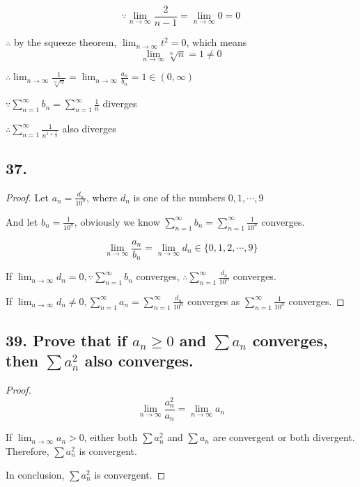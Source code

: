 \documentclass{article}
\begin{document}
    $$\because \lim_{n\to\infty} \frac{2}{n-1} = \lim_{n\to\infty}0 = 0$$

    $\therefore$ by the squeeze theorem, $\lim_{n\to\infty} t^2 = 0$, which means $$\lim_{n\to\infty} \sqrt[n]n = 1 \not = 0$$

    $\therefore \lim_{n\to\infty} \frac{1}{\sqrt[n]n} = \lim_{n\to\infty}\frac{a_n}{b_n} = 1 \in (0, \infty)$
    
    $\because \sum_{n=1}^\infty b_n = \sum_{n=1}^\infty \frac 1 n$ diverges

    $\therefore \sum_{n=1}^\infty \frac{1}{n^{1+\frac 1 n}}$ also diverges

    \subsection*{37. }

    \begin{proof}
        Let $a_n = \frac{d_n}{10^n}$, where $d_n$ is one of the numbers $0, 1, \cdots, 9$
        
        And let $b_n = \frac{1}{10^n}$, obviously we know $\sum_{n=1}^\infty b_n = \sum_{n=1}^\infty \frac{1}{10^n}$ converges. 

        $$\lim_{n\to\infty}\frac{a_n}{b_n} = \lim_{n\to\infty}d_n \in \{0, 1, 2, \cdots, 9\}$$

        If $\lim_{n\to\infty}d_n = 0, \because \sum_{n=1}^\infty b_n$ converges, $\therefore \sum_{n=1}^\infty \frac{d_n}{10^n}$ converges.

        If $\lim_{n\to\infty}d_n \not = 0, \sum_{n=1}^\infty a_n = \sum_{n=1}^\infty \frac{d_n}{10^n}$ converges as $\sum_{n=1}^\infty \frac{1}{10^n}$ converges.

    \end{proof}

    \subsection*{39. Prove that if $a_n \geq 0$ and $\sum a_n$ converges, then $\sum a_n^2$ also converges.}

    \begin{proof}
        $$\lim_{n\to\infty}\frac{a_n^2}{a_n} = \lim_{n\to\infty}a_n$$

        If $\lim_{n\to\infty}a_n > 0$, either both $\sum a_n^2$ and $\sum a_n$ are convergent or both divergent. Therefore, $\sum a_n^2$ is convergent.



        In conclusion, $\sum a_n^2$ is convergent.
    \end{proof}
\end{document}
